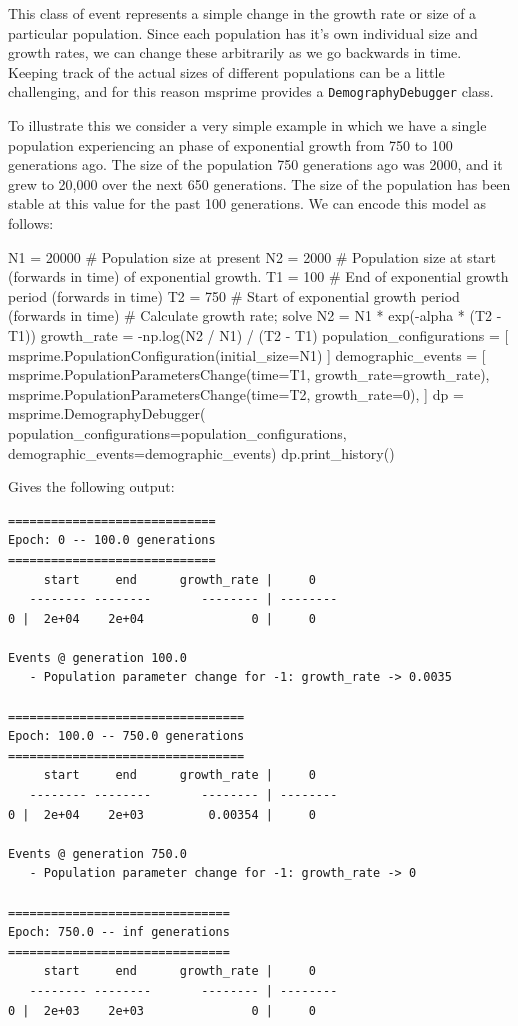 \documentclass[graybox]{svmult}
\begin{document}
This class of event represents a simple change in the growth rate or
size of a particular population. Since each population has it's own
individual size and growth rates, we can change these arbitrarily as we
go backwards in time. Keeping track of the actual sizes of different
populations can be a little challenging, and for this reason msprime
provides a \texttt{DemographyDebugger} class.

To illustrate this we consider a very simple example in which we have a
single population experiencing an phase of exponential growth from 750
to 100 generations ago. The size of the population 750 generations ago
was 2000, and it grew to 20,000 over the next 650 generations. The size
of the population has been stable at this value for the past 100
generations. We can encode this model as follows:

\begin{pythoncode}
N1 = 20000  # Population size at present
N2 = 2000   # Population size at start (forwards in time) of exponential growth.
T1 = 100    # End of exponential growth period (forwards in time)
T2 = 750    # Start of exponential growth period (forwards in time)
# Calculate growth rate; solve N2 = N1 * exp(-alpha * (T2 - T1))
growth_rate = -np.log(N2 / N1) / (T2 - T1)
population_configurations = [
    msprime.PopulationConfiguration(initial_size=N1)
]
demographic_events = [
    msprime.PopulationParametersChange(time=T1, growth_rate=growth_rate),
    msprime.PopulationParametersChange(time=T2, growth_rate=0),
]
dp = msprime.DemographyDebugger(
    population_configurations=population_configurations,
    demographic_events=demographic_events)
dp.print_history()
\end{pythoncode}

Gives the following output:
\begin{footnotesize}
\begin{verbatim}
=============================
Epoch: 0 -- 100.0 generations
=============================
     start     end      growth_rate |     0
   -------- --------       -------- | --------
0 |  2e+04    2e+04               0 |     0

Events @ generation 100.0
   - Population parameter change for -1: growth_rate -> 0.0035

=================================
Epoch: 100.0 -- 750.0 generations
=================================
     start     end      growth_rate |     0
   -------- --------       -------- | --------
0 |  2e+04    2e+03         0.00354 |     0

Events @ generation 750.0
   - Population parameter change for -1: growth_rate -> 0

===============================
Epoch: 750.0 -- inf generations
===============================
     start     end      growth_rate |     0
   -------- --------       -------- | --------
0 |  2e+03    2e+03               0 |     0

\end{verbatim}
\end{footnotesize}
\end{document}
